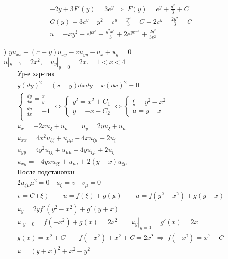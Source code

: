 \begin{enumerate}
\begin{gather*}
   -2y +3F'(y)=3e^{y} \ \Rightarrow \ F(y)  = e^{y} + \frac{y^{2}}{3}+C \\
   G(y)=3e^{y}+y^{2}-e^{y}- \frac{y^{2}}{3}-C = 2e^{y} + \frac{2y^{2}}{3}-C\\
   \boxed{u = -xy^{2}+e^{yx^{2}}+ \frac{y^{2}x^{4}}{3}+2e^{yx^{-1}}+ \frac{2y^{2}}{3x^{2}}}
  \end{gather*} \newpage
\item[\text{г})] $yu_{xx}+(x-y)u_{xy}-xu_{yy}-u_{x}+u_{y}=0$ \\
  $u|_{y=0}=2x^{2}, \quad u_{y}|_{y=0}=2x, \quad 1<x<4$ \\
  \begin{gather*}
    \text{Ур-е хар-тик} \\
    y(dy)^{2}-(x-y)dxdy-x(dx)^{2}=0 \\
    \begin{cases}
     \frac{dy}{dx}= \frac{x}{y} \\ \frac{dy}{dx} =-1 \\ 
    \end{cases} \Leftrightarrow 
    \begin{cases}
      y^{2}= x^{2} +C_{1} \\ y = -x +C_{2}
    \end{cases} \Leftrightarrow 
    \begin{cases}
      \xi = y^{2}- x^{2} \\ \mu = y+x
    \end{cases} \\
    u_{x}= -2xu_{\xi}+u_{\mu} \qquad u_{y}= 2yu_{\xi}+u_{\mu} \\
    u_{xx}=4x^{2}u_{\xi\xi}+u_{\mu\mu}-4xu_{\xi\mu}-2u_{\xi} \\
    u_{yy}=4y^{2}u_{\xi\xi}+u_{\mu\mu}+4yu_{\xi\mu}+2u_{\xi} \\
    u_{xy}=-4yxu_{\xi\xi}+u_{\mu\mu}+2(y-x)u_{\xi\mu} \\
    \text{После подстановки} \\
    2u_{\xi\mu}\mu^{2}=0 \quad u_{\xi}=v \quad  v_{\mu} = 0 \\
    v = C(\xi) \qquad u = f(\xi)+g(\mu) \qquad u = f(y^{2}-x^{2})+g(y+x) \\
    u_{y} = 2yf'(y^{2}-x^{2})+g'(y+x) \\
    u|_{y=0} = f(-x^{2}) + g(x)=2x^{2} \qquad u_{y}|_{y=0}=  g'(x) =2x \\
    g(x)=x^{2}+C \qquad f(-x^{2})+x^{2}+C=2x^{2} \ \Rightarrow \ f(-x^{2}) = x^{2}-C \\
    u=(y+x)^{2}+x^{2}-y^{2} \\

\end{gather*}
\end{enumerate}

